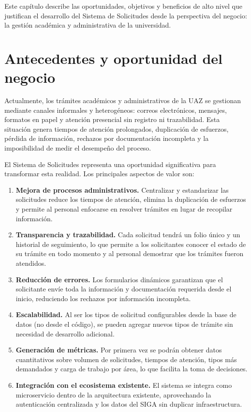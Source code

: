 \documentclass[12pt,letterpaper]{report}
\begin{document}
Este capítulo describe las oportunidades, objetivos y beneficios de alto nivel que justifican el desarrollo del Sistema de Solicitudes desde la perspectiva del negocio: la gestión académica y administrativa de la universidad.

\section{Antecedentes y oportunidad del negocio}

Actualmente, los trámites académicos y administrativos de la UAZ se gestionan mediante canales informales y heterogéneos: correos electrónicos, mensajes, formatos en papel y atención presencial sin registro ni trazabilidad. Esta situación genera tiempos de atención prolongados, duplicación de esfuerzos, pérdida de información, rechazos por documentación incompleta y la imposibilidad de medir el desempeño del proceso.

El Sistema de Solicitudes representa una oportunidad significativa para transformar esta realidad. Los principales aspectos de valor son:

\begin{enumerate}
    \item \textbf{Mejora de procesos administrativos.} Centralizar y estandarizar las solicitudes reduce los tiempos de atención, elimina la duplicación de esfuerzos y permite al personal enfocarse en resolver trámites en lugar de recopilar información.

    \item \textbf{Transparencia y trazabilidad.} Cada solicitud tendrá un folio único y un historial de seguimiento, lo que permite a los solicitantes conocer el estado de su trámite en todo momento y al personal demostrar que los trámites fueron atendidos.

    \item \textbf{Reducción de errores.} Los formularios dinámicos garantizan que el solicitante envíe toda la información y documentación requerida desde el inicio, reduciendo los rechazos por información incompleta.

    \item \textbf{Escalabilidad.} Al ser los tipos de solicitud configurables desde la base de datos (no desde el código), se pueden agregar nuevos tipos de trámite sin necesidad de desarrollo adicional.

    \item \textbf{Generación de métricas.} Por primera vez se podrán obtener datos cuantitativos sobre volumen de solicitudes, tiempos de atención, tipos más demandados y carga de trabajo por área, lo que facilita la toma de decisiones.

    \item \textbf{Integración con el ecosistema existente.} El sistema se integra como microservicio dentro de la arquitectura existente, aprovechando la autenticación centralizada y los datos del SIGA sin duplicar infraestructura.
\end{enumerate}
\end{document}
